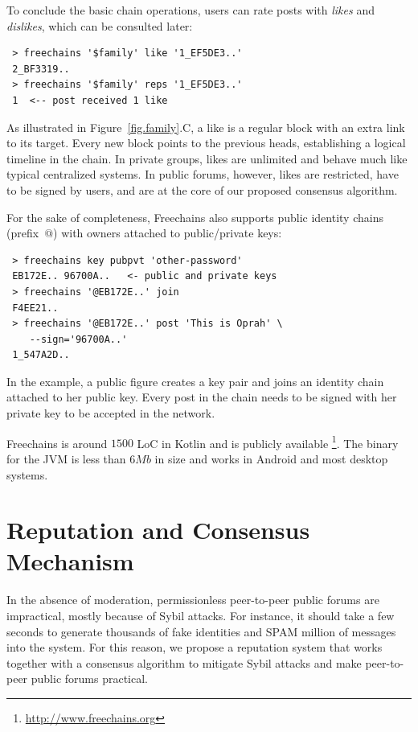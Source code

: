 \documentclass[10pt,journal,compsoc]{IEEEtran}
\newcommand{\FC}       {Freechains\xspace}
\begin{document}
To conclude the basic chain operations, users can rate posts with \emph{likes}
and \emph{dislikes}, which can be consulted later:

{\footnotesize
\begin{verbatim}
 > freechains '$family' like '1_EF5DE3..'
 2_BF3319..
 > freechains '$family' reps '1_EF5DE3..'
 1  <-- post received 1 like
\end{verbatim}
}

As illustrated in Figure~\ref{fig.family}.C, a like is a regular block with an
extra link to its target.
Every new block points to the previous heads, establishing a logical timeline
in the chain.
In private groups, likes are unlimited and behave much like typical centralized
systems.
In public forums, however, likes are restricted, have to be signed by users,
and are at the core of our proposed consensus algorithm.

For the sake of completeness, \FC also supports public identity chains
(prefix~$@$) with owners attached to public/private keys:

{\footnotesize
\begin{verbatim}
 > freechains key pubpvt 'other-password'
 EB172E.. 96700A..   <- public and private keys
 > freechains '@EB172E..' join
 F4EE21..
 > freechains '@EB172E..' post 'This is Oprah' \
    --sign='96700A..'
 1_547A2D..
\end{verbatim}
}

In the example, a public figure creates a key pair and joins an identity chain
attached to her public key.
Every post in the chain needs to be signed with her private key to be accepted
in the network.

\FC is around $1500$ LoC in Kotlin and is publicly available%
\footnote{\url{http://www.freechains.org}}.
The binary for the JVM is less than $6Mb$ in size and works in Android and most
desktop systems.

\section{Reputation and Consensus Mechanism}
\label{sec.consensus}

In the absence of moderation, permissionless peer-to-peer public forums are
impractical, mostly because of Sybil attacks.
For instance, it should take a few seconds to generate thousands of fake
identities and SPAM million of messages into the system.
For this reason, we propose a reputation system that works together with a
consensus algorithm to mitigate Sybil attacks and make peer-to-peer public
forums practical.
\end{document}
